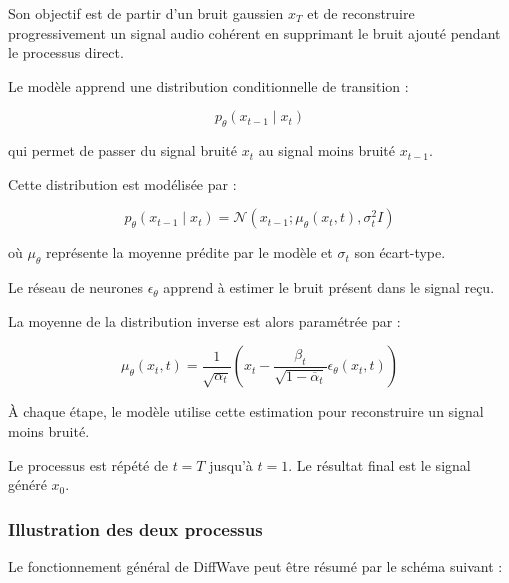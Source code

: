 Son objectif est de partir d'un bruit gaussien $x_T$
et de reconstruire progressivement un signal audio
cohérent en supprimant le bruit ajouté pendant le
processus direct.

Le modèle apprend une distribution conditionnelle
de transition :

\[
p_{\theta}(x_{t-1}\mid x_t)
\]

qui permet de passer du signal bruité $x_t$ au signal
moins bruité $x_{t-1}$.

Cette distribution est modélisée par :

\[
p_{\theta}(x_{t-1}\mid x_t)
=
\mathcal{N}
\left(
x_{t-1};
\mu_{\theta}(x_t,t),
\sigma_t^2 I
\right)
\]

où $\mu_{\theta}$ représente la moyenne prédite par
le modèle et $\sigma_t$ son écart-type.

Le réseau de neurones $\epsilon_{\theta}$ apprend à
estimer le bruit présent dans le signal reçu.

La moyenne de la distribution inverse est alors
paramétrée par :

\[
\boxed{
\mu_{\theta}(x_t,t)=
\frac{1}{\sqrt{\alpha_t}}
\left(
x_t-
\frac{\beta_t}
{\sqrt{1-\overline{\alpha}_t}}
\epsilon_{\theta}(x_t,t)
\right)
}
\]

À chaque étape, le modèle utilise cette estimation
pour reconstruire un signal moins bruité.

Le processus est répété de $t=T$ jusqu'à $t=1$.
Le résultat final est le signal généré $x_0$.

\subsubsection{Illustration des deux processus}

Le fonctionnement général de DiffWave peut être résumé
par le schéma suivant :

